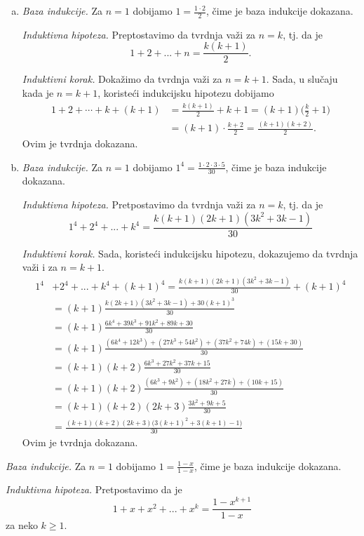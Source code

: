 \clearpage

\begin{enumerate}[(a)]
\item {\it Baza indukcije.} Za $n=1$ dobijamo $1=\frac {1\cdot2}2$, \v cime je baza indukcije dokazana.

{\it Induktivna hipoteza.} Preptostavimo da tvrdnja va\v zi za $n=k$, tj. da je
\[1+2+...+n=\frac {k(k+1)}2.\]

{\it Induktivni korak.} Doka\v zimo da tvrdnja va\v zi za $n=k+1$. Sada, u slu\v caju kada je $n=k+1$, koriste\' ci indukcijsku hipotezu dobijamo
\begin{align*}
1+2+\cdots+k+(k+1)&=\frac{k(k+1)}2+k+1=(k+1)\Big(\frac{k}2+1\Big)\\
&=(k+1)\cdot\frac{k+2}2=\frac{(k+1)(k+2)}2.
\end{align*}
Ovim je tvrdnja dokazana.
\item[(c)] {\it Baza indukcije.} Za $n=1$ dobijamo $1^4=\frac {1\cdot 2\cdot 3\cdot5}{30}$, \v cime je baza indukcije dokazana.

{\it Induktivna hipoteza.} Pretpostavimo da tvrdnja va\v zi za $n=k$, tj. da je
\[1^4+2^4+...+k^4=\frac{k(k+1)(2k+1)(3k^2+3k-1)}{30}\]

{\it Induktivni korak.} Sada, koriste\' ci indukcijsku hipotezu, dokazujemo da tvrdnja va\v zi i za $n=k+1$.
\begin{align*}
1^4&+2^4+...+k^4+(k+1)^4=\frac{k(k+1)(2k+1)(3k^2+3k-1)}{30}+(k+1)^4\\
&=(k+1)\frac{k(2k+1)(3k^2+3k-1)+30(k+1)^3}{30}\\
&=(k+1)\frac{6 k^4+39 k^3+91k^2+89k+30}{30}\\
&=(k+1)\frac{(6k^4+12k^3)+(27k^3+54k^2)+(37k^2+74k)+(15k+30)}{30}\\
&=(k+1)(k+2)\frac{6k^3+27k^2+37k+15}{30}\\
&=(k+1)(k+2)\frac{(6k^3+9k^2)+(18k^2+27k)+(10k+15)}{30}\\
&=(k+1)(k+2)(2k+3)\frac{3k^2+9k+5}{30}\\
&=\frac{(k+1)(k+2)(2k+3)\big(3(k+1)^2+3(k+1)-1\big)}{30}
\end{align*}
Ovim je tvrdnja dokazana.
\end{enumerate}

 {\it Baza indukcije.} Za $n=1$ dobijamo $1=\frac{1-x}{1-x}$, \v cime je baza indukcije dokazana.

{\it Induktivna hipoteza.} Pretpostavimo da je \[1+x+x^2+...+x^k=\frac{1-x^{k+1}}{1-x}\] za neko $k\geq 1$.

